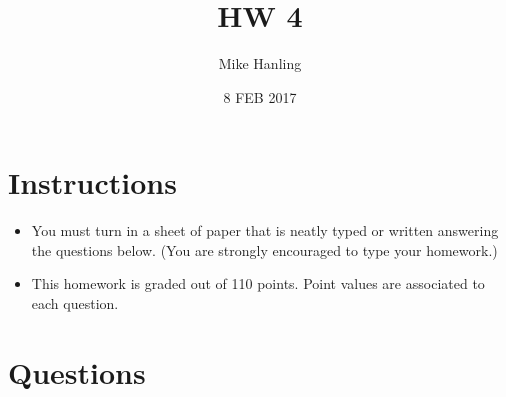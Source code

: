 \documentclass{article}[9pt]
\title{HW 4}
\author{Mike Hanling}
\date{8 FEB 2017}
\begin{document}
\maketitle

\section*{Instructions}
\begin{itemize}

\item You must turn in a sheet of paper that is neatly typed or written answering the questions below. (You are strongly encouraged to type your homework.)

\item This homework is graded out of 110 points. Point values are associated to each question.

\end{itemize}
\section*{Questions}
\end{document}
